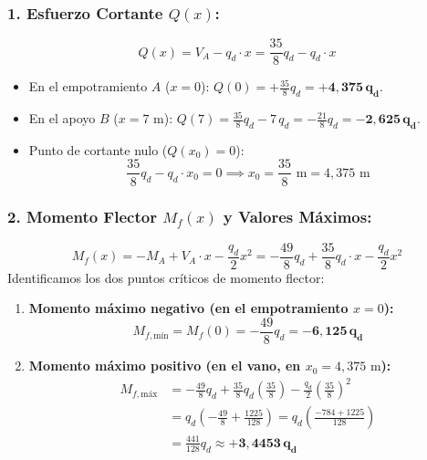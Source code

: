 \subsubsection*{1. Esfuerzo Cortante $Q(x)$:}
\begin{equation}
    Q(x) = V_A - q_d \cdot x = \frac{35}{8}q_d - q_d \cdot x
\end{equation}
\begin{itemize}
    \item En el empotramiento $A$ ($x = 0$): $Q(0) = +\frac{35}{8}q_d = \mathbf{+4{,}375\,q_d}$.
    \item En el apoyo $B$ ($x = 7\text{ m}$): $Q(7) = \frac{35}{8}q_d - 7\,q_d = -\frac{21}{8}q_d = \mathbf{-2{,}625\,q_d}$.
    \item Punto de cortante nulo ($Q(x_0) = 0$):
          \begin{equation}
              \frac{35}{8}q_d - q_d \cdot x_0 = 0 \implies \boxed{x_0 = \frac{35}{8}\text{ m} = 4{,}375\text{ m}}
          \end{equation}
\end{itemize}

\subsubsection*{2. Momento Flector $M_f(x)$ y Valores Máximos:}
\begin{equation}
    M_f(x) = -M_A + V_A \cdot x - \frac{q_d}{2}x^2 = -\frac{49}{8}q_d + \frac{35}{8}q_d \cdot x - \frac{q_d}{2}x^2
\end{equation}
Identificamos los dos puntos críticos de momento flector:
\begin{enumerate}
    \item \textbf{Momento máximo negativo (en el empotramiento $x = 0$):}
          \begin{equation}
              M_{f,\text{mín}} = M_f(0) = -\frac{49}{8}q_d = \mathbf{-6{,}125\,q_d}
          \end{equation}
    \item \textbf{Momento máximo positivo (en el vano, en $x_0 = 4{,}375\text{ m}$):}
          \begin{align}
              M_{f,\text{máx}} & = -\frac{49}{8}q_d + \frac{35}{8}q_d\left(\frac{35}{8}\right) - \frac{q_d}{2}\left(\frac{35}{8}\right)^2 \nonumber \\
                               & = q_d \left( -\frac{49}{8} + \frac{1225}{128} \right) = q_d \left( \frac{-784 + 1225}{128} \right) \nonumber \\
                               & = \frac{441}{128}q_d \approx \mathbf{+3{,}4453\,q_d}
          \end{align}
\end{enumerate}

